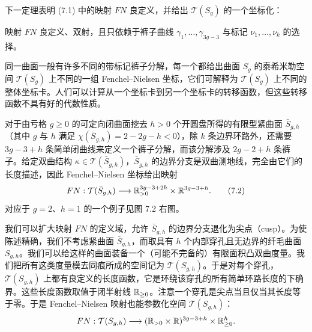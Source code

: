 下一定理表明 (7.1) 中的映射 $FN$ 良定义，并给出 $\mathcal{T}(S_g)$ 的一个坐标化：

\begin{theorem} 映射 $FN$ 良定义、双射，且只依赖于裤子曲线 $\gamma_1,\dots,\gamma_{3g-3}$ 与标记 $\nu_1,\dots,\nu_k$ 的选择。\end{theorem}


同一曲面一般有许多不同的带标记裤子分解，每一个都给出曲面 $S_g$ 的泰希米勒空间 $\mathcal{T}(S_g)$ 上不同的一组 Fenchel–Nielsen 坐标，它们可解释为 $\mathcal{T}(S_g)$ 上不同的整体坐标卡。人们可以计算从一个坐标卡到另一个坐标卡的转移函数，但这些转移函数不具有好的代数性质。

对于由亏格 $g\ge0$ 的可定向闭曲面挖去 $h>0$ 个开圆盘所得的有限型紧曲面 $\bar S_{g,h}$（其中 $g$ 与 $h$ 满足 $\chi(\bar S_{g,h})=2-2g-h<0$），除 $k$ 条边界环路外，还需要 $3g-3+h$ 条简单闭曲线来定义一个裤子分解，而该分解涉及 $2g-2+h$ 条裤子。给定双曲结构 $\kappa\in\mathcal{T}(\bar S_{g,h})$，$\bar S_{g,h}$ 的边界分支是双曲测地线，完全由它们的长度描述，因此 Fenchel–Nielsen 坐标给出映射
\begin{equation}
FN:\mathcal{T}(\bar S_{g,h})\longrightarrow \mathbb{R}^{3g-3+2h}_{>0}\times\mathbb{R}^{3g-3+h}.
\tag{7.2}
\end{equation}
对应于 $g=2$、$h=1$ 的一个例子见图 7.2 右图。

我们可以扩大映射 $FN$ 的定义域，允许 $\bar S_{g,h}$ 的边界分支退化为尖点（cusp）。为使陈述精确，我们不考虑紧曲面 $\bar S_{g,h}$，而取具有 $h$ 个内部穿孔且无边界的纤毛曲面 $S_{g,h}$。我们可以给这样的曲面装备一个（可能不完备的）有限面积凸双曲度量。我们把所有这类度量模去同痕所成的空间记为 $\mathcal{T}(S_{g,h})$。于是对每个穿孔，$\mathcal{T}(S_{g,h})$ 上都有良定义的长度函数，它是环绕该穿孔的所有简单环路长度的下确界。这些长度函数取值于闭半射线 $\mathbb{R}_{\ge0}$。注意一个穿孔是尖点当且仅当其长度等于零。于是 Fenchel–Nielsen 映射也能参数化空间 $\mathcal{T}(S_{g,h})$：
\[
FN:\mathcal{T}(S_{g,h})\longrightarrow (\mathbb{R}_{>0}\times\mathbb{R})^{3g-3+h}\times\mathbb{R}^{h}_{\ge0}.
\]

